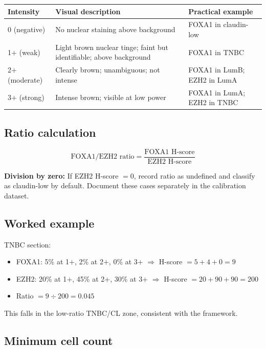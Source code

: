 \documentclass[11pt, a4paper]{article}
\begin{document}
\begin{center}
\begin{tabular}{p{2.5cm}p{5cm}p{5.5cm}}
\toprule
\textbf{Intensity} &
\textbf{Visual description} &
\textbf{Practical example} \\
\midrule
0 (negative) &
No nuclear staining above
background &
FOXA1 in claudin-low \\[0.3em]
1$+$ (weak) &
Light brown nuclear tinge;
faint but identifiable;
above background &
FOXA1 in TNBC \\[0.3em]
2$+$ (moderate) &
Clearly brown; unambiguous;
not intense &
FOXA1 in LumB; EZH2 in LumA \\[0.3em]
3$+$ (strong) &
Intense brown; visible at
low power &
FOXA1 in LumA; EZH2 in TNBC \\
\bottomrule
\end{tabular}
\end{center}

\subsection{Ratio calculation}

\begin{equation}
\text{FOXA1/EZH2 ratio} =
\frac{\text{FOXA1 H-score}}
     {\text{EZH2 H-score}}
\end{equation}

\textbf{Division by zero:} If EZH2 H-score
$= 0$, record ratio as undefined and classify
as claudin-low by default. Document these
cases separately in the calibration dataset.

\subsection{Worked example}

TNBC section:
\begin{itemize}[noitemsep]
    \item FOXA1: 5\% at 1$+$, 2\% at 2$+$,
    0\% at 3$+$ $\Rightarrow$
    H-score $= 5 + 4 + 0 = 9$
    \item EZH2: 20\% at 1$+$, 45\% at 2$+$,
    30\% at 3$+$ $\Rightarrow$
    H-score $= 20 + 90 + 90 = 200$
    \item Ratio $= 9 \div 200 = 0.045$
\end{itemize}

This falls in the low-ratio TNBC/CL zone,
consistent with the framework.

\subsection{Minimum cell count}
\end{document}
